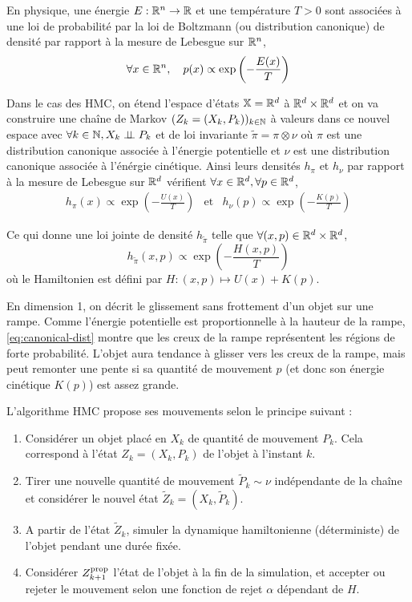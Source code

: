 \documentclass[10pt,a4paper]{article}
\begin{document}
\begin{Def}
	En physique, une énergie $E : \mathbb{R}^n \to \mathbb{R}$ et une température $T > 0$ sont associées à une loi de probabilité par la loi de Boltzmann (ou distribution canonique) de densité par rapport à la mesure de Lebesgue sur $\mathbb{R}^n$,
	$$\forall x \in \mathbb{R}^n,  \quad p(x) \propto \exp \left( -\frac{E(x)}{T} \right)$$
\end{Def}


Dans le cas des HMC, on étend l'espace d'états $\mathbb{X} = \mathbb{R}^d$ à $\mathbb{R}^d \times \mathbb{R}^d$ et on va construire une chaîne de Markov $(Z_k = (X_k, P_k))_{k \in \mathbb{N}}$ à valeurs dans ce nouvel espace avec $\forall k \in \mathbb{N}, X_k \perp\!\!\!\perp P_k$ et de loi invariante $\widetilde{\pi} = \pi \otimes \nu$ où $\pi$ est une distribution canonique associée à l'énergie potentielle et $\nu$ est une distribution canonique associée à l'énérgie cinétique. Ainsi leurs densités $h_\pi$ et $h_\nu$ par rapport à la mesure de Lebesgue sur $\mathbb{R}^d$ vérifient $\forall x \in \mathbb{R}^d, \forall p \in \mathbb{R}^d$,
\begin{eqnarray*}
	h_\pi(x) \propto  \exp \left( -\frac{U(x)}{T} \right) & \text{et} &
	h_\nu(p) \propto  \exp \left( -\frac{K(p)}{T} \right)
\end{eqnarray*}

Ce qui donne une loi jointe de densité $h_{\widetilde{\pi}}$ telle que $\forall (x,p) \in \mathbb{R}^d \times \mathbb{R}^d$, 
\begin{equation} \label{eq:canonical-dist}
	h_{\widetilde{\pi}}(x,p) \propto \exp \left( -\frac{H(x,p)}{T} \right)
\end{equation}
où le Hamiltonien est défini par $H : (x,p) \mapsto U(x) + K(p)$.

\begin{Rque}
	En dimension 1, on décrit le glissement sans frottement d'un objet sur une rampe. Comme l'énergie potentielle est proportionnelle à la hauteur de la rampe, \eqref{eq:canonical-dist} montre que les creux de la rampe représentent les régions de forte probabilité. L'objet aura tendance à glisser vers les creux de la rampe, mais peut remonter une pente si sa quantité de mouvement $p$ (et donc son énergie cinétique $K(p)$) est assez grande.
\end{Rque}

L'algorithme HMC propose ses mouvements selon le principe suivant : 
\begin{enumerate}
	\item Considérer un objet placé en $X_k$ de quantité de mouvement $P_k$. Cela correspond à l'état $Z_k = (X_k, P_k)$ de l'objet à l'instant $k$.
	\item Tirer une nouvelle quantité de mouvement $\tilde{P}_k \sim \nu$ indépendante de la chaîne et considérer le nouvel état $\tilde{Z}_k = (X_k, \tilde{P}_k)$. 
	\item A partir de l'état $\tilde{Z}_k$, simuler la dynamique hamiltonienne (déterministe) de l'objet pendant une durée fixée.
	\item Considérer $Z_{k+1}^{\rm prop}$ l'état de l'objet à la fin de la simulation, et accepter ou rejeter le mouvement selon une fonction de rejet $\alpha$ dépendant de $H$. 
\end{enumerate}
\end{document}

